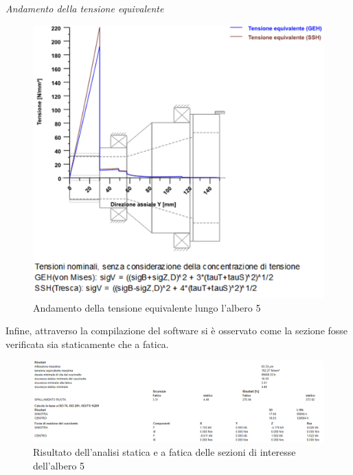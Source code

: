 \emph{Andamento della tensione equivalente}
\begin{figure}[h]
    \centering
    \includegraphics[scale=0.35]{Immagini/TensioniAlbero5.png}
    \caption{Andamento della tensione equivalente lungo l'albero 5}
    \label{fig:TensioniAlbero5}
\end{figure}
\newpage
Infine, attraverso la compilazione del software si è osservato come la sezione fosse verificata sia staticamente che a fatica.
\begin{figure}[h]
    \centering
       \includegraphics[scale=0.5]{Immagini/RisultatiAlbero5.png}
    \caption{Risultato dell'analisi statica e a fatica delle sezioni di interesse dell'albero 5}
    \label{fig:RisultatiALbero5}
\end{figure}
